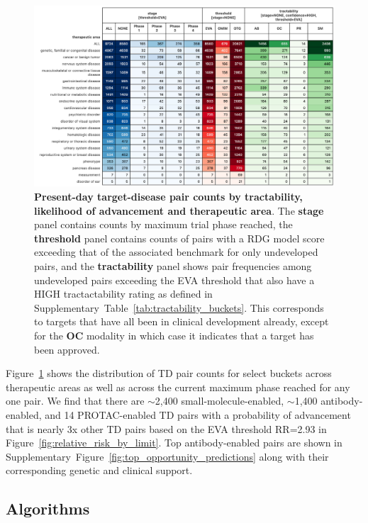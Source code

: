 \documentclass{article}
\begin{document}
\begin{figure}[!htb]
  \centering
  \captionsetup{width=.9\linewidth}
  \includegraphics[width=1\textwidth]{opportunity_summary.png}
  \caption{
    \textbf{Present-day target-disease pair counts by tractability, likelihood of advancement and therapeutic area}. The \textbf{stage} panel contains counts by maximum trial phase reached, the \textbf{threshold} panel contains counts of pairs with a RDG model score exceeding that of the associated benchmark for only undeveloped pairs, and the \textbf{tractability} panel shows pair frequencies among undeveloped pairs exceeding the EVA threshold that also have a HIGH tractactability rating as defined in Supplementary~Table~\ref{tab:tractability_buckets}. This corresponds to targets that have all been in clinical development already, except for the \textbf{OC} modality in which case it indicates that a target has been approved. 
  }
  \label{fig:opportunity_summary}
\end{figure}

Figure~\ref{fig:opportunity_summary} shows the distribution of TD pair counts for select buckets across therapeutic areas as well as across the current maximum phase reached for any one pair. We find that there are $\sim$2,400 small-molecule-enabled, $\sim$1,400 antibody-enabled, and 14 PROTAC-enabled TD pairs with a probability of advancement that is nearly 3x other TD pairs based on the EVA threshold RR=2.93 in Figure~\ref{fig:relative_risk_by_limit}. Top antibody-enabled pairs are shown in Supplementary~Figure~\ref{fig:top_opportunity_predictions} along with their corresponding genetic and clinical support.

\subsection{Algorithms}
\end{document}
